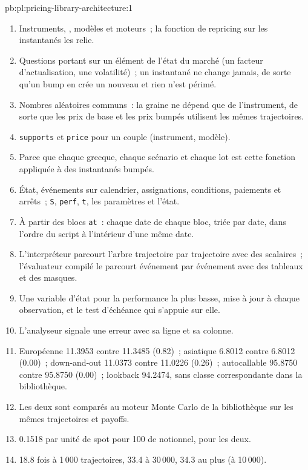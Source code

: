 \begin{solution}{pb:pl:pricing-library-architecture:1}
\begin{enumerate}
\item Instruments, , modèles et moteurs~; la fonction de repricing sur les instantanés les relie.
\item Questions portant sur un élément de l'état du marché (un facteur d'actualisation, une volatilité)~; un instantané ne change jamais, de sorte qu'un bump en crée un nouveau et
rien n'est périmé.
\item Nombres aléatoires communs~: la graine ne dépend que de l'instrument, de sorte que les prix de base et les prix bumpés utilisent les mêmes trajectoires.
\item \texttt{supports} et \texttt{price} pour un couple (instrument, modèle).
\item Parce que chaque grecque, chaque scénario et chaque lot est cette fonction appliquée à des instantanés bumpés.
\item État, événements sur calendrier, assignations, conditions, paiements et arrêts~; \texttt{S}, \texttt{perf}, \texttt{t}, les paramètres et
l'état.
\item À partir des blocs \texttt{at}~: chaque date de chaque bloc, triée par date, dans l'ordre du script à l'intérieur d'une même date.
\item L'interpréteur parcourt l'arbre trajectoire par trajectoire avec des scalaires~; l'évaluateur compilé le parcourt événement par événement avec des tableaux et des masques.
\item Une variable d'état pour la performance la plus basse, mise à jour à chaque observation, et le test d'échéance qui s'appuie sur elle.
\item L'analyseur signale une erreur avec sa ligne et sa colonne.
\item Européenne 11.3953 contre 11.3485 (0.82)~; asiatique 6.8012 contre 6.8012 (0.00)~; down-and-out 11.0373 contre 11.0226 (0.26)~;
autocallable 95.8750 contre 95.8750 (0.00)~; lookback 94.2474, sans classe correspondante dans la bibliothèque.
\item Les deux sont comparés au moteur Monte Carlo de la bibliothèque sur les mêmes trajectoires et payoffs.
\item 0.1518 par unité de spot pour 100 de notionnel, pour les deux.
\item 18.8 fois à 1\,000 trajectoires, 33.4 à 30\,000, 34.3 au plus (à 10\,000).

\end{enumerate}
\end{solution}

